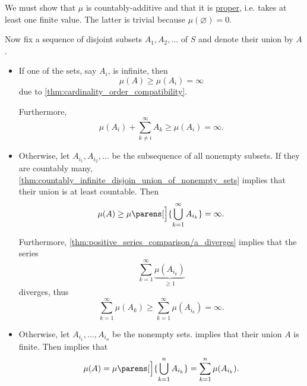 \begin{defproof}
  We must show that \( \mu \) is countably-additive and that it is \hyperref[def:effective_domain]{proper}, i.e. takes at least one finite value. The latter is trivial because \( \mu(\varnothing) = 0 \).

  Now fix a sequence of disjoint subsets \( A_1, A_2, \ldots \) of \( S \) and denote their union by \( A \).

  \begin{itemize}
    \item If one of the sets, say \( A_i \), is infinite, then
    \begin{equation*}
      \mu(A) \geq \mu(A_i) = \infty
    \end{equation*}
    due to \cref{thm:cardinality_order_compatibility}.

    Furthermore,
    \begin{equation*}
      \mu(A_i) + \sum_{k \neq i}^\infty A_k \geq \mu(A_i) = \infty.
    \end{equation*}

    \item Otherwise, let \( A_{i_1}, A_{i_2}, \ldots \) be the subsequence of all nonempty subsets. If they are countably many, \cref{thm:countably_infinite_disjoin_union_of_nonempty_sets} implies that their union is at least countable. Then
    \begin{equation*}
      \mu(A) \geq \mu\parens[\Big]{ \bigcup_{k=1}^\infty A_{i_k} } = \infty.
    \end{equation*}

    Furthermore, \cref{thm:positive_series_comparison/a_diverges} implies that the series
    \begin{equation*}
      \sum_{k=1}^\infty \underbrace{\mu(A_{i_k})}_{\geq 1}
    \end{equation*}
    diverges, thus
    \begin{equation*}
      \sum_{k=1}^\infty \mu(A_k) \geq \sum_{k=1}^\infty \mu(A_{i_k}) = \infty.
    \end{equation*}

    \item Otherwise, let \( A_{i_1}, \ldots, A_{i_n} \) be the nonempty sets.  implies that their union \( A \) is finite. Then  implies that
    \begin{equation*}
      \mu(A) = \mu\parens[\Big]{ \bigcup_{k=1}^n A_{i_k} } = \sum_{k=1}^n \mu(A_{i_k}).
    \end{equation*}
  \end{itemize}
\end{defproof}

